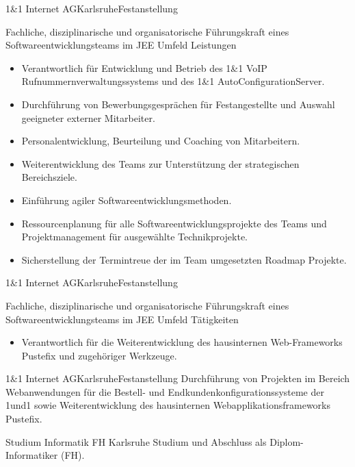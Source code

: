 \documentclass[11pt, a4paper, sans]{moderncv}
\begin{document}
 {1\&1 Internet AG}{Karlsruhe}{Festanstellung}{
Fachliche, disziplinarische und organisatorische Führungskraft eines Softwareentwicklungsteams im JEE Umfeld
\newline{}\newline{}
Leistungen
\begin{itemize}
\item Verantwortlich für Entwicklung und Betrieb des 1\&1 VoIP Rufnummernverwaltungssystems und des 1\&1 AutoConfigurationServer.
\item Durchführung von Bewerbungsgesprächen für Festangestellte und Auswahl geeigneter externer Mitarbeiter.
\item Personalentwicklung, Beurteilung und Coaching von Mitarbeitern.
\item Weiterentwicklung des Teams zur Unterstützung der strategischen Bereichsziele.
\item Einführung agiler Softwareentwicklungsmethoden.
\item Ressourcenplanung für alle Softwareentwicklungsprojekte des Teams und Projektmanagement für ausgewählte Technikprojekte.
\item Sicherstellung der Termintreue der im Team umgesetzten Roadmap Projekte.
\end{itemize}}

 {1\&1 Internet AG}{Karlsruhe}{Festanstellung}{
Fachliche, disziplinarische und organisatorische Führungskraft eines Softwareentwicklungsteams im JEE Umfeld
\newline{}\newline{}
Tätigkeiten
\begin{itemize}
\item Verantwortlich für die Weiterentwicklung des hausinternen Web-Frameworks Pustefix und zugehöriger Werkzeuge.
\end{itemize}}

 {1\&1 Internet AG}{Karlsruhe}{Festanstellung} {
Durchführung von Projekten im Bereich Webanwendungen für die Bestell- und Endkundenkonfigurationssysteme der 1und1 sowie Weiterentwicklung des hausinternen Webapplikationsframeworks Pustefix.
}

 {Studium Informatik} {FH Karlsruhe} {}{} {
Studium und Abschluss als Diplom-Informatiker (FH).
} 
\end{document}
